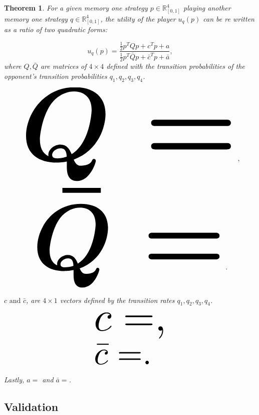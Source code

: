 \documentclass[10pt]{article}
\newtheorem{theorem}{Theorem}
\begin{document}
\begin{theorem}\label{theorem:quadratic_form_u}
    For a given memory one strategy \(p\in\mathbb{R}_{[0,1]}^4\) playing another 
    memory one strategy \(q\in\mathbb{R}_{[0,1]}^4\), the 
    utility of the player \(u_q(p)\) can be re written as a ratio of two quadratic
    forms:
    
    \begin{equation}\label{eq:optimisation_quadratic}
    u_q(p) = \frac{\frac{1}{2}p^TQp + c^Tp + a}
                {\frac{1}{2}p^T\bar{Q}p + \bar{c}^Tp + \bar{a}}, 
    \end{equation}
    where \(Q, \bar{Q}\) are matrices of \(4 \times 4\) defined with the transition
    probabilities of the opponent's transition probabilities \(q_1, q_2, q_3, q_4\).
    
    \begin{center}
    \begin{equation}
    \resizebox{0.9\linewidth}{!}{\arraycolsep=2.5pt%
    \boldmath\(
    Q = \)},
    \end{equation}
    \begin{equation}\label{eq:q_bar_matrix}
    \resizebox{0.8\linewidth}{!}{\arraycolsep=2.5pt%
    \boldmath\(
    \bar{Q} =  \)}.
    \end{equation}
    \end{center}
    
    \(c \text{ and } \bar{c}\), are \(4 \times 1\) vectors defined by the transition rates 
    \(q_1, q_2, q_3, q_4\).
    
    \begin{equation}\label{eq:q_matrix_numerator}
    \resizebox{0.3\linewidth}{!}{\arraycolsep=2.5pt%
    \(c = \),}
    \end{equation}
    \begin{equation}\label{eq:q_matrix_denominator}
    \resizebox{0.3\linewidth}{!}{\arraycolsep=2.5pt%
    \(\bar{c} = \).
    }
    \end{equation}
    
    Lastly, \(a = \) and 
    \(\bar{a} = \).
    \end{theorem}

\subsection{Validation}
\end{document}
